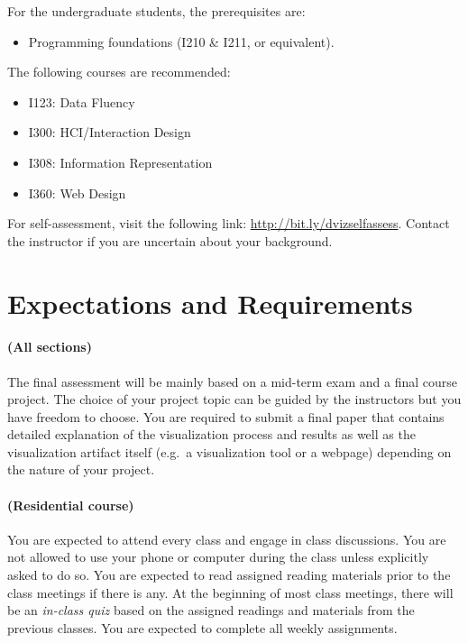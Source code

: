\documentclass[11pt,article,oneside]{memoir} %
\begin{document}
For the undergraduate students, the prerequisites are:
%
\begin{itemize}\vspace{-10pt}
%
\item Programming foundations (I210 \& I211, or equivalent). 
%
\end{itemize}\vspace{-10pt}
%
The following courses are recommended: 
%
\begin{itemize}\vspace{-10pt}
%
\item I123: Data Fluency \item I300: HCI/Interaction Design \item I308:
Information Representation \item I360: Web Design
%
\end{itemize}\vspace{-10pt}

For self-assessment, visit the following link: \href{http://bit.ly/dvizselfassess}{http://bit.ly/dvizselfassess}. 
Contact the instructor if you are uncertain about your background. 

\section{Expectations and Requirements}%
\label{sec:requirements}

\paragraph{(All sections)} The final assessment will be mainly based on a mid-term exam and a final course project. 
The choice of your project topic can be guided by the instructors but you have freedom to choose.
You are required to submit a final paper that contains detailed explanation of the visualization process and results as well as the visualization artifact itself (e.g.~a visualization tool or a webpage) depending on the nature of your project. 

\paragraph{(Residential course)} You are expected to attend every class and engage in class discussions. 
You are not allowed to use your phone or computer during the class unless explicitly asked to do so.  
You are expected to read assigned reading materials prior to the class meetings if there is any.
At the beginning of most class meetings, there will be an \emph{in-class quiz} based on the assigned readings and materials from the previous classes. 
You are expected to complete all weekly assignments. 
\end{document}
